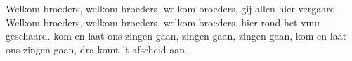 \beginverse*
Welkom broeders, welkom broeders,
welkom broeders, gij allen hier vergaard.
Welkom broeders, welkom broeders,
welkom broeders, hier rond het vuur geschaard.
\endverse 
\beginverse*
kom en laat ons zingen gaan,
zingen gaan, zingen gaan,
kom en laat ons zingen gaan,
dra komt 't afscheid aan.
\endverse 
\endsong 